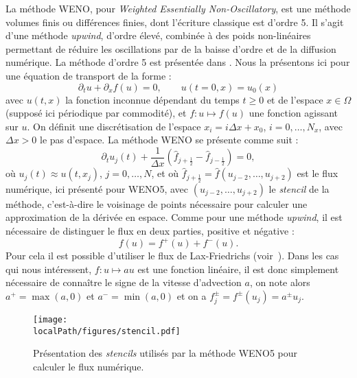La méthode WENO, pour \emph{Weighted Essentially Non-Oscillatory}, est une méthode volumes finis ou différences finies, dont l'écriture classique est d'ordre 5. Il s'agit d'une méthode \emph{upwind}, d'ordre élevé, combinée à des poids non-linéaires permettant de réduire les oscillations par de la baisse d'ordre et de la diffusion numérique. La méthode d'ordre 5 est présentée dans \cite{Liu:1994,Jiang:1996,Shu:1999,Shu:2003}. Nous la présentons ici pour une équation de transport de la forme :
\begin{equation}
  \partial_t u + \partial_x f(u) = 0,\qquad u(t=0,x) = u_0(x)
  \label{eq:0:dtudxfu}
\end{equation}
avec $u(t,x)$ la fonction inconnue dépendant du temps $t\geq 0$ et de l'espace $x\in\Omega$ (supposé ici périodique par commodité), et $f:u\mapsto f(u)$ une fonction agissant sur $u$. On définit une discrétisation de l'espace $x_i = i\Delta x + x_0$, $i=0,\dots,N_x$, avec $\Delta x>0$ le pas d'espace. La méthode WENO se présente comme suit :
$$
  \partial_t u_j(t) + \frac{1}{\Delta x}\left( \hat{f}_{j+\frac{1}{2}} - \hat{f}_{j-\frac{1}{2}} \right) = 0,
$$
où $u_j(t)\approx u(t,x_j)$, $j=0,\dots,N$, et où $\hat{f}_{j+\frac{1}{2}} = \hat{f}(u_{j-2},\dots,u_{j+2})$ est le flux numérique, ici présenté pour WENO5, avec $(u_{j-2},\dots,u_{j+2})$ le \emph{stencil} de la méthode, c'est-à-dire le voisinage de points nécessaire pour calculer une approximation de la dérivée en espace. Comme pour une méthode \emph{upwind}, il est nécessaire de distinguer le flux en deux parties, positive et négative :
$$
  f(u) = f^+(u) + f^-(u).
$$
Pour cela il est possible d'utiliser le flux de Lax-Friedrichs (voir~\cite{Shu:1997}). Dans les cas qui nous intéressent, $f:u\mapsto au$ est une fonction linéaire, il est donc simplement nécessaire de connaître le signe de la vitesse d'advection $a$, on note alors $a^+ = \max(a,0)$ et $a^-=\min(a,0)$ et on a $f^\pm_j=f^\pm(u_j)=a^\pm u_j$.

\begin{figure}[h]
  \centering
  \texttt{[image: \\localPath/figures/stencil.pdf]}
  \caption{Présentation des \emph{stencils} utilisés par la méthode WENO5 pour calculer le flux numérique.}
  \label{fig:intro:stencil}
\end{figure}

